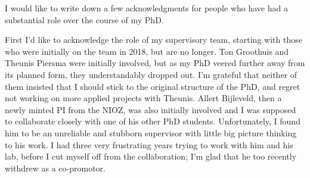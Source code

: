 \label{ch:ack}


\bigskip

\begingroup
\let\clearpage\relax
\let\cleardoublepage\relax
\let\cleardoublepage\relax

I would like to write down a few acknowledgments for people who have had a substantial role over the course of my PhD.

First I'd like to acknowledge the role of my supervisory team, starting with those who were initially on the team in 2018, but are no longer.
Ton Groothuis and Theunis Piersma were initially involved, but as my PhD veered further away from its planned form, they understandably dropped out.
I'm grateful that neither of them insisted that I should stick to the original structure of the PhD, and regret not working on more applied projects with Theunis.
Allert Bijleveld, then a newly minted PI from the NIOZ, was also initially involved and I was supposed to collaborate closely with one of his other PhD students.
Unfortunately, I found him to be an unreliable and stubborn supervisor with little big picture thinking to his work.
I had three very frustrating years trying to work with him and his lab, before I cut myself off from the collaboration; I'm glad that he too recently withdrew as a co-promotor.

